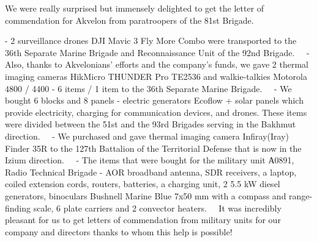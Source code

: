 We were really surprised but immensely delighted to get the letter of
commendation for Akvelon from paratroopers of the 81st Brigade.

- 2 surveillance drones DJI Mavic 3 Fly More Combo were transported to the 36th
Separate Marine Brigade and Reconnaissance Unit of the 92nd Brigade.
⠀
- Also, thanks to Akvelonians’ efforts and the company’s funds, we gave 2
thermal imaging cameras HikMicro THUNDER Pro TE2536 and walkie-talkies Motorola
4800 / 4400 - 6 items / 1 item to the 36th Separate Marine Brigade.
⠀
- We bought 6 blocks and 8 panels - electric generators Ecoflow + solar panels
which provide  electricity, charging for communication devices, and drones.
These items were divided between the 51st and the 93rd Brigades serving in the
Bakhmut direction.
⠀
- We purchased and gave thermal imaging camera Infiray(Iray) Finder 35R to the
127th Battalion of the Territorial Defense that is now in the Izium direction.
⠀
- The items that were bought for the military unit А0891, Radio Technical
Brigade - AOR broadband antenna, SDR receivers, a laptop, coiled extension
cords, routers, batteries, a charging unit, 2  5.5 kW diesel generators,
binoculars Bushnell Marine Blue 7x50 mm with a compass and range-finding scale,
6 plate carriers and 2 convector heaters.
⠀
It was incredibly pleasant for us to get letters of commendation from military
units for our company and directors thanks to whom this help is possible!
